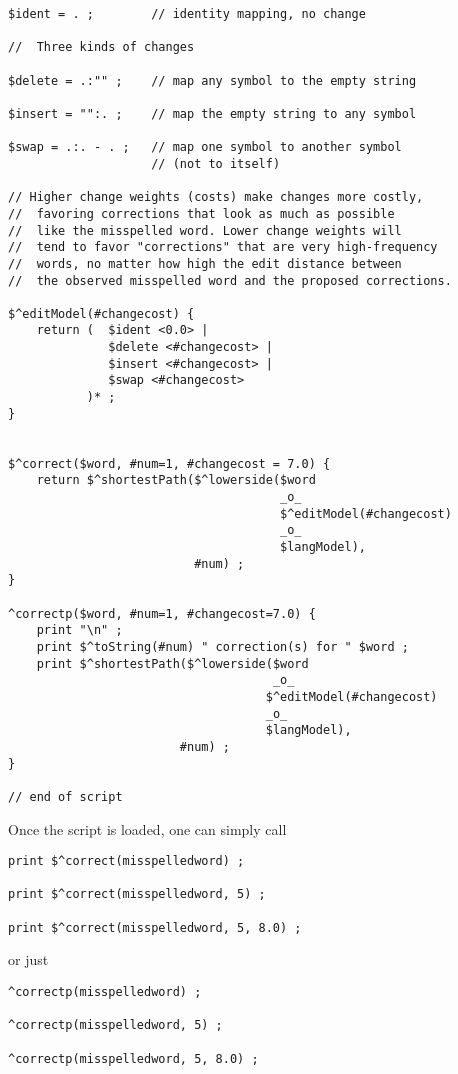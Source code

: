\begin{Verbatim}
$ident = . ;        // identity mapping, no change

//	Three kinds of changes

$delete = .:"" ;    // map any symbol to the empty string

$insert = "":. ;    // map the empty string to any symbol

$swap = .:. - . ;   // map one symbol to another symbol 
                    // (not to itself)

// Higher change weights (costs) make changes more costly,
//  favoring corrections that look as much as possible
//  like the misspelled word. Lower change weights will
//  tend to favor "corrections" that are very high-frequency
//  words, no matter how high the edit distance between
//  the observed misspelled word and the proposed corrections.

$^editModel(#changecost) {
    return (  $ident <0.0> | 
              $delete <#changecost> | 
              $insert <#changecost> |
              $swap <#changecost>
           )* ;
}


$^correct($word, #num=1, #changecost = 7.0) {
    return $^shortestPath($^lowerside($word 
                                      _o_ 
                                      $^editModel(#changecost) 
                                      _o_
                                      $langModel), 
                          #num) ;
}

^correctp($word, #num=1, #changecost=7.0) {
    print "\n" ;
    print $^toString(#num) " correction(s) for " $word ;
    print $^shortestPath($^lowerside($word 
                                     _o_ 
                                    $^editModel(#changecost)
                                    _o_
                                    $langModel), 
                        #num) ;
}

// end of script
\end{Verbatim}

Once the script is loaded, one can simply call

\begin{Verbatim}
print $^correct(misspelledword) ;

print $^correct(misspelledword, 5) ;

print $^correct(misspelledword, 5, 8.0) ;
\end{Verbatim}

\noindent
or just

\begin{Verbatim}
^correctp(misspelledword) ;

^correctp(misspelledword, 5) ;

^correctp(misspelledword, 5, 8.0) ;
\end{Verbatim}

